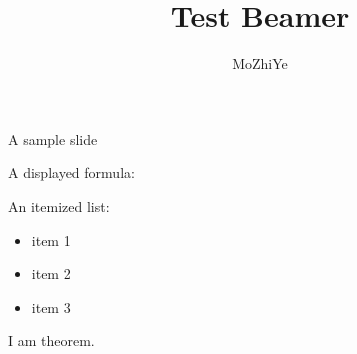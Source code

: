 \documentclass{beamer}
\author{MoZhiYe}
\title{Test Beamer}
\institute{China}
\begin{document}
\begin{frame}{A sample slide}

A displayed formula:

An itemized list:
\begin{itemize}
    \item item 1
    \pause
    \item item 2
    \pause
    \item item 3
\end{itemize}

\pause
\begin{theorem}
    I am theorem.
\end{theorem}

\end{frame}
\end{document}
